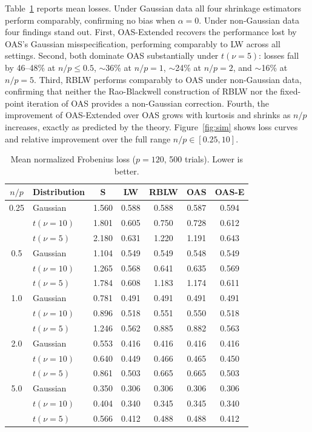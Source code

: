 \documentclass[journal]{IEEEtran}
\begin{document}
Table~\ref{tab:sim} reports mean losses.
Under Gaussian data all four shrinkage estimators perform comparably, confirming no bias
when $\alpha=0$.
Under non-Gaussian data four findings stand out.
First, OAS-Extended recovers the performance lost by OAS's Gaussian misspecification,
performing comparably to LW across all settings.
Second, both dominate OAS substantially under $t(\nu\!=\!5)$: losses fall by 46--48\%
at $n/p\leq0.5$, $\sim$36\% at $n/p=1$, $\sim$24\% at $n/p=2$, and $\sim$16\% at $n/p=5$.
Third, RBLW performs comparably to OAS under non-Gaussian data, confirming that
neither the Rao-Blackwell construction of RBLW nor the fixed-point iteration of OAS
provides a non-Gaussian correction.
Fourth, the improvement of OAS-Extended over OAS grows with kurtosis and shrinks
as $n/p$ increases, exactly as predicted by the theory.
Figure~\ref{fig:sim} shows loss curves and relative improvement over the full range
$n/p\in[0.25,10]$.

\begin{table}[ht]
\centering
\caption{Mean normalized Frobenius loss ($p=120$, 500 trials). Lower is better.}
\label{tab:sim}
\begin{tabular}{clccccc}
\toprule
$n/p$ & Distribution & S & LW & RBLW & OAS & OAS-E \\
\midrule
0.25 & Gaussian          & 1.560 & 0.588 & 0.588 & 0.587 & 0.594 \\
     & $t(\nu\!=\!10)$ & 1.801 & 0.605 & 0.750 & 0.728 & 0.612 \\
     & $t(\nu\!=\!5)$  & 2.180 & 0.631 & 1.220 & 1.191 & 0.643 \\
\midrule
0.5  & Gaussian          & 1.104 & 0.549 & 0.549 & 0.548 & 0.549 \\
     & $t(\nu\!=\!10)$ & 1.265 & 0.568 & 0.641 & 0.635 & 0.569 \\
     & $t(\nu\!=\!5)$  & 1.784 & 0.608 & 1.183 & 1.174 & 0.611 \\
\midrule
1.0  & Gaussian          & 0.781 & 0.491 & 0.491 & 0.491 & 0.491 \\
     & $t(\nu\!=\!10)$ & 0.896 & 0.518 & 0.551 & 0.550 & 0.518 \\
     & $t(\nu\!=\!5)$  & 1.246 & 0.562 & 0.885 & 0.882 & 0.563 \\
\midrule
2.0  & Gaussian          & 0.553 & 0.416 & 0.416 & 0.416 & 0.416 \\
     & $t(\nu\!=\!10)$ & 0.640 & 0.449 & 0.466 & 0.465 & 0.450 \\
     & $t(\nu\!=\!5)$  & 0.861 & 0.503 & 0.665 & 0.665 & 0.503 \\
\midrule
5.0  & Gaussian          & 0.350 & 0.306 & 0.306 & 0.306 & 0.306 \\
     & $t(\nu\!=\!10)$ & 0.404 & 0.340 & 0.345 & 0.345 & 0.340 \\
     & $t(\nu\!=\!5)$  & 0.566 & 0.412 & 0.488 & 0.488 & 0.412 \\
\bottomrule
\end{tabular}
\end{table}
\end{document}
